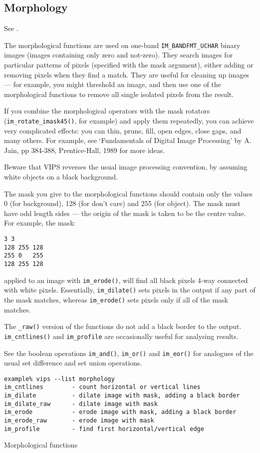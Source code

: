 \subsection{Morphology}

See .

The morphological functions are used on one-band \verb+IM_BANDFMT_UCHAR+ binary
images (images containing only zero and not-zero). They search images
for particular patterns of pixels (specified with the mask argument),
either adding or removing pixels when they find a match. They are useful
for cleaning up images --- for example, you might threshold an image, and
then use one of the morphological functions to remove all single isolated
pixels from the result.

If you combine the morphological operators with the mask rotators
(\verb+im_rotate_imask45()+, for example) and apply them repeatedly, you
can achieve very complicated effects: you can thin, prune, fill, open edges,
close gaps, and many others. For example, see `Fundamentals  of  Digital
Image Processing' by A.  Jain, pp 384-388, Prentice-Hall, 1989 for more ideas.

Beware that VIPS reverses the usual image processing convention, by assuming
white objects on a black background.

The mask you give to the morphological functions should contain only the
values 0 (for background), 128 (for don't care) and 255 (for object). The
mask must have odd length sides --- the origin of the mask is taken to be
the centre value. For example, the mask:

\begin{verbatim}
3 3 
128 255 128
255 0   255
128 255 128
\end{verbatim}
  
\noindent
applied to an image with \verb+im_erode()+, will find all black pixels
4-way connected with white pixels. Essentially, \verb+im_dilate()+
sets  pixels  in the output  if  any part of the mask matches, whereas
\verb+im_erode()+ sets pixels only if all of the mask matches.

The \verb+_raw()+ version of the functions do not add a black border to the
output. \verb+im_cntlines()+ and \verb+im_profile+ are occasionally useful for 
analysing results.

See the boolean operations \verb+im_and()+, \verb+im_or()+  and
\verb+im_eor()+ for  analogues of  the  usual  set difference and set
union operations.

\begin{fig2}
\begin{verbatim}
example% vips --list morphology
im_cntlines        - count horizontal or vertical lines
im_dilate          - dilate image with mask, adding a black border
im_dilate_raw      - dilate image with mask
im_erode           - erode image with mask, adding a black border
im_erode_raw       - erode image with mask
im_profile         - find first horizontal/vertical edge
\end{verbatim}
\caption{Morphological functions}
\label{fg:morph}
\end{fig2}

